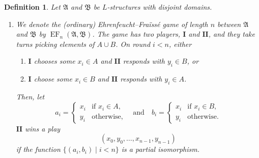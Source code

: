 \documentclass[10pt,a4paper]{amsart}
\newtheorem{definition}{Definition}[section]
\newcommand{\playerone}{\mathrm{\mathbf{I}}}
\newcommand{\playertwo}{\mathrm{\mathbf{II}}}
\DeclareMathOperator{\EF}{EF}
\newcommand{\A}{\mathfrak{A}}
\newcommand{\B}{\mathfrak{B}}
\begin{document}
\begin{definition}
    Let $\A$ and $\B$ be $L$-structures with disjoint domains.
    \begin{enumerate}
        \item We denote the (ordinary) Ehrenfeucht--Fraïssé game of length $n$ between $\A$ and $\B$ by $\EF_n(\A,\B)$. The game has two players, $\playerone$ and $\playertwo$, and they take turns picking elements of $A\cup B$. On round $i<n$, either
        \begin{enumerate}
            \item $\playerone$ chooses some $x_i\in A$ and $\playertwo$ responds with $y_i\in B$, or
            \item $\playerone$ choose some $x_i\in B$ and $\playertwo$ responds with $y_i\in A$.
        \end{enumerate}
        Then, let
        \[
            a_i =
            \begin{cases}
                x_i & \text{if $x_i\in A$,} \\
                y_i & \text{otherwise,}
            \end{cases}
            \quad\text{and}\quad
            b_i =
            \begin{cases}
                x_i & \text{if $x_i\in B$,} \\
                y_i & \text{otherwise.}
            \end{cases}
        \]
        $\playertwo$ wins a play
        \[
            (x_0,y_0,\dots,x_{n-1},y_{n-1})
        \]
        if the function $\{(a_i,b_i) \mid i<n\}$ is a partial isomorphism.
        

\end{enumerate}
\end{definition}
\end{document}
